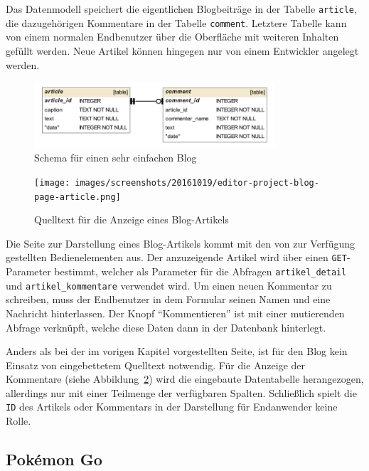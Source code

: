 Das Datenmodell speichert die eigentlichen Blogbeiträge in der Tabelle \texttt{article}, die dazugehörigen Kommentare in der Tabelle \texttt{comment}. Letztere Tabelle kann von einem normalen Endbenutzer über die Oberfläche mit weiteren Inhalten gefüllt werden. Neue Artikel können hingegen nur von einem Entwickler angelegt werden.

\begin{figure}[h]
  \centering \includegraphics[width=0.8\textwidth]{images/db-schema/blog}
  \caption{Schema für einen sehr einfachen Blog}
  \label{fig:project-blog-schema}
\end{figure}

\begin{figure}[h]
  \centering \texttt{[image: images/screenshots/20161019/editor-project-blog-page-article.png]}
  \caption{Quelltext für die Anzeige eines Blog-Artikels}
  \label{fig:project-blog-page-article}
\end{figure}

Die Seite zur Darstellung eines Blog-Artikels kommt mit den von \idename{} zur Verfügung gestellten Bedienelementen aus. Der anzuzeigende Artikel wird über einen \texttt{GET}-Parameter bestimmt, welcher als Parameter für die Abfragen \texttt{artikel\_detail} und \texttt{artikel\_kommentare} verwendet wird. Um einen neuen Kommentar zu schreiben, muss der Endbenutzer in dem Formular seinen Namen und eine Nachricht hinterlassen. Der Knopf "`Kommentieren"' ist mit einer mutierenden Abfrage verknüpft, welche diese Daten dann in der Datenbank hinterlegt.

Anders als bei der im vorigen Kapitel  vorgestellten Seite, ist für den Blog kein Einsatz von eingebettetem Quelltext notwendig. Für die Anzeige der Kommentare (siehe Abbildung~\ref{fig:project-blog-page-article}) wird die eingebaute Datentabelle herangezogen, allerdings nur mit einer Teilmenge der verfügbaren Spalten. Schließlich spielt die \texttt{ID} des Artikels oder Kommentars in der Darstellung für Endanwender keine Rolle.

\subsection{Pokémon Go}

